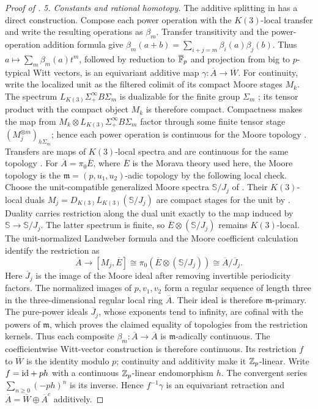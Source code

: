 \begin{proof}[Proof of ]
\medskip\noindent\emph{5. Constants and rational homotopy.} The additive splitting in
\cite[Proposition~2.5.1]{BSSW} has a direct construction.
Compose each power operation with the $K(3)$-local transfer and
write the resulting operations as $\beta_m$.  Transfer transitivity
and the power-operation addition formula give
$\beta_m(a+b)=\sum_{i+j=m}\beta_i(a)\beta_j(b)$.
Thus $a\mapsto\sum_m\beta_m(a)t^m$, followed by reduction to
$\overline{\mathbb F}_p$ and projection from big to $p$-typical Witt vectors,
is an equivariant additive map
$\gamma:\overline A\to\overline W$.
For continuity, write the localized unit as the filtered colimit of its
compact Moore stages $M_k$. The spectrum
$L_{K(3)}\Sigma^\infty_+B\Sigma_m$ is dualizable for the finite
group $\Sigma_m$ \cite[Corollary~8.7]{HS99}; its tensor product with
the compact object $M_k$ is therefore compact. Compactness makes the map from
$M_k\otimes L_{K(3)}\Sigma^\infty_+ B\Sigma_m$ factor through some
finite tensor stage $(M_j^{\otimes m})_{h\Sigma_m}$; hence each
power operation is continuous for the Moore topology
\cite[Lemma~2.5.4]{BSSW}.
Transfers are maps of $K(3)$-local spectra and are continuous
for the same topology \cite[Proposition~11.1(b)]{HS99}.
For $\overline A=\pi_0\overline E$, where $\overline E$ is the
Morava theory used here, the Moore topology is the
$\mathfrak m=(p,u_1,u_2)$-adic topology by the following local check.
Choose the unit-compatible generalized Moore spectra $\mathbb S/J_j$
of \cite[Proposition~4.22]{HS99}.  Their $K(3)$-local duals
$M_j=D_{K(3)}L_{K(3)}(\mathbb S/J_j)$ are compact stages for the unit
by \cite[Corollary~7.11 and Theorem~8.5]{HS99}.  Duality carries restriction
along the dual unit exactly to the map induced by
$\mathbb S\to\mathbb S/J_j$.  The latter spectrum is finite, so
$\overline E\otimes(\mathbb S/J_j)$ remains $K(3)$-local.
The unit-normalized Landweber formula
\cite[Introduction and Example~0.1(d)]{HoveyStrickland} and the Moore
coefficient calculation \cite[Definition~4.12]{HS99} identify the restriction as
\[
 \overline A\longrightarrow[M_j,\overline E]
   \cong\pi_0(\overline E\otimes(\mathbb S/J_j))
   \cong\overline A/\overline J_j.
\]
Here $\overline J_j$ is the image of the Moore ideal after
removing invertible periodicity factors.  The normalized images of
$p,v_1,v_2$ form a regular sequence of length three in the
three-dimensional regular local ring $\overline A$.  Their ideal
is therefore $\mathfrak m$-primary.  The pure-power ideals
$\overline J_j$, whose exponents tend to infinity, are cofinal with
the powers of $\mathfrak m$,
which proves the claimed equality of topologies from the restriction
kernels.  Thus each composite $\beta_m:\overline A\to\overline A$
is $\mathfrak m$-adically continuous.  The coefficientwise
Witt-vector construction is therefore continuous.
Its restriction $f$ to $\overline W$ is the identity modulo $p$;
continuity and additivity make it $\mathbb Z_p$-linear.  Write
$f=\mathrm{id}+p h$ with a continuous $\mathbb Z_p$-linear endomorphism $h$.
The convergent series $\sum_{n\geq0}(-p h)^n$ is its inverse.
Hence $f^{-1}\gamma$ is an equivariant retraction and
$\overline A=\overline W\oplus\overline A^c$ additively.


\end{proof}
